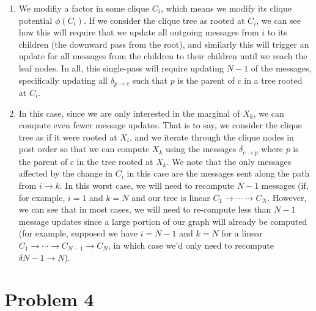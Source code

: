 \documentclass[12pt]{article}
\begin{document}
\begin{enumerate}[label=(\alph*)]
\item We modifiy a factor in some clique $C_i$, which means we modify its clique potential $\phi(C_i)$. If we consider the clique tree as rooted at $C_i$, we can see how this will require that we update all outgoing messages from $i$ to its children (the downward pass from the root), and similarly this will trigger an update for all messages from the children to their children until we reach the leaf nodes. In all, this single-pass will require updating $N-1$ of the messages, specifically updating all $\delta_{p \to c}$ such that $p$ is the parent of $c$ in a tree rooted at $C_i$.
\item In this case, since we are only interested in the marginal of $X_k$, we can compute even fewer message updates. That is to say, we consider the clique tree as if it were rooted at $X_i$, and we iterate through the clique nodes in post order so that we can compute $X_k$ using the messages $\delta_{c \to p}$ where $p$ is the parent of $c$ in the tree rooted at $X_k$. We note that the only messages affected by the change in $C_i$ in this case are the messages sent along the path from $i \to k$. In this worst case, we will need to recompute $N - 1$ messages (if, for example, $i = 1$ and $k=N$ and our tree is linear $C_1 \to \cdots \to C_N$. However, we can see that in most cases, we will need to re-compute less than $N - 1$ message updates since a large portion of our graph will already be computed (for example, supposed we have $i = N - 1$ and $k = N$ for a linear $C_ 1 \to \cdots \to C_{N-1} \to C_{N}$, in which case we'd only need to recompute $\delta{N-1 \to N}$).
\end{enumerate}

\pagebreak
\section*{Problem 4}
\end{document}

